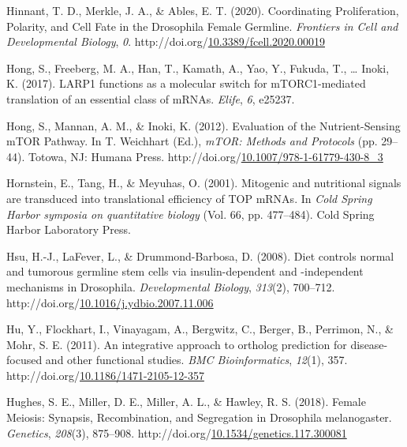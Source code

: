 \documentclass[12pt,oneside]{reedthesis}
\newlength{\cslhangindent}
\newenvironment{CSLReferences}[2] %
 {%
  \setlength{\parindent}{0pt}
  \ifodd #1 \everypar{\setlength{\hangindent}{\cslhangindent}}\ignorespaces\fi
  \ifnum #2 > 0
  \setlength{\parskip}{#2\baselineskip}
  \fi
 }%
 {}
\begin{document}
\begin{CSLReferences}{1}{0}
\leavevmode{}%
Hinnant, T. D., Merkle, J. A., \& Ables, E. T. (2020). Coordinating {Proliferation}, {Polarity}, and {Cell Fate} in the {Drosophila Female Germline}. \emph{Frontiers in Cell and Developmental Biology}, \emph{0}. http://doi.org/\href{https://doi.org/10.3389/fcell.2020.00019}{10.3389/fcell.2020.00019}

\leavevmode{}%
Hong, S., Freeberg, M. A., Han, T., Kamath, A., Yao, Y., Fukuda, T., \ldots{} Inoki, K. (2017). {LARP1} functions as a molecular switch for {mTORC1-mediated} translation of an essential class of {mRNAs}. \emph{Elife}, \emph{6}, e25237.

\leavevmode{}%
Hong, S., Mannan, A. M., \& Inoki, K. (2012). Evaluation of the {Nutrient-Sensing mTOR Pathway}. In T. Weichhart (Ed.), \emph{{mTOR}: {Methods} and {Protocols}} (pp. 29--44). {Totowa, NJ}: {Humana Press}. http://doi.org/\href{https://doi.org/10.1007/978-1-61779-430-8_3}{10.1007/978-1-61779-430-8\_3}

\leavevmode{}%
Hornstein, E., Tang, H., \& Meyuhas, O. (2001). Mitogenic and nutritional signals are transduced into translational efficiency of {TOP mRNAs}. In \emph{Cold {Spring Harbor} symposia on quantitative biology} (Vol. 66, pp. 477--484). {Cold Spring Harbor Laboratory Press}.

\leavevmode{}%
Hsu, H.-J., LaFever, L., \& Drummond-Barbosa, D. (2008). Diet controls normal and tumorous germline stem cells via insulin-dependent and -independent mechanisms in {Drosophila}. \emph{Developmental Biology}, \emph{313}(2), 700--712. http://doi.org/\href{https://doi.org/10.1016/j.ydbio.2007.11.006}{10.1016/j.ydbio.2007.11.006}

\leavevmode{}%
Hu, Y., Flockhart, I., Vinayagam, A., Bergwitz, C., Berger, B., Perrimon, N., \& Mohr, S. E. (2011). An integrative approach to ortholog prediction for disease-focused and other functional studies. \emph{BMC Bioinformatics}, \emph{12}(1), 357. http://doi.org/\href{https://doi.org/10.1186/1471-2105-12-357}{10.1186/1471-2105-12-357}

\leavevmode{}%
Hughes, S. E., Miller, D. E., Miller, A. L., \& Hawley, R. S. (2018). Female {Meiosis}: {Synapsis}, {Recombination}, and {Segregation} in {Drosophila} melanogaster. \emph{Genetics}, \emph{208}(3), 875--908. http://doi.org/\href{https://doi.org/10.1534/genetics.117.300081}{10.1534/genetics.117.300081}


\end{CSLReferences}
\end{document}
